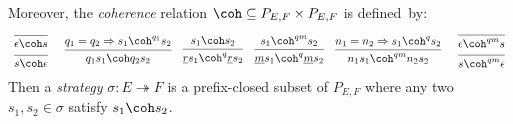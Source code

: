 \documentclass[acmsmall,nonacm]{acmart}
\begin{document}
\begin{definition}[Strategy]
Moreover, the \emph{coherence} relation ${\coh} \subseteq P_{E,F} \times P_{E,F}$
is defined~by:
\[
  \begin{array}{c}
    \begin{prooftree}
      \infer0{\epsilon \coh s}
    \end{prooftree}
    \\[1ex]
    \begin{prooftree}
      \infer0{s \coh \epsilon}
    \end{prooftree}
  \end{array}
  \quad
  \begin{prooftree}
    \hypo{q_1 = q_2 \Rightarrow s_1 \coh^{q_1} s_2}
    \infer1{q_1 s_1 \coh q_2 s_2}
  \end{prooftree}
  \quad
  \begin{prooftree}
    \hypo{s_1 \coh s_2}
    \infer1{\underline{r} s_1 \coh^q \underline{r} s_2}
  \end{prooftree}
  \quad
  \begin{prooftree}
    \hypo{s_1 \coh^{qm} s_2}
    \infer1{\underline{m} s_1 \coh^q \underline{m} s_2}
  \end{prooftree}
  \quad
  \begin{prooftree}
    \hypo{n_1 = n_2 \Rightarrow s_1 \coh^q s_2}
    \infer1{n_1 s_1 \coh^{qm} n_2 s_2}
  \end{prooftree}
  \quad
  \begin{array}{c}
    \begin{prooftree}
      \infer0{\epsilon \coh^{qm} s}
    \end{prooftree}
    \\[1ex]
    \begin{prooftree}
      \infer0{s \coh^{qm} \epsilon}
    \end{prooftree}
  \end{array}
\]
Then a \emph{strategy} $\sigma : E \twoheadrightarrow F$
is a prefix-closed subset of $P_{E,F}$ where
any two $s_1, s_2 \in \sigma$ satisfy $s_1 \coh s_2$.
\end{definition}
\end{document}
